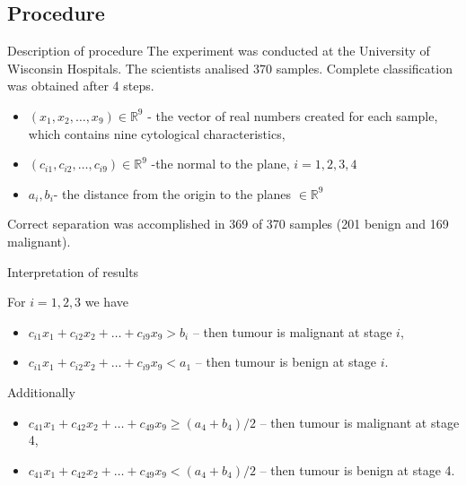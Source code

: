 \documentclass{beamer}
\begin{document}
\subsection{Procedure}
\begin{frame}[allowframebreaks]{Description of procedure}
The experiment was conducted at the University of Wisconsin Hospitals. The scientists analised 370 samples. Complete classification was obtained after 4 steps.
\begin{block}

\begin{itemize}
\item $(x_1,x_2, \ldots, x_9) \in \mathbb{R}^9$ - the vector of real numbers created for each sample, which contains nine cytological characteristics,
\item  $(c_{i1},c_{i2}, \ldots, c_{i9}) \in \mathbb{R}^9$ -the normal to the plane, $i=1,2,3,4$
\item $a_i,b_i$- the distance from the origin to the planes  $\in \mathbb{R}^9$
\end{itemize}

\end{block}
Correct separation was accomplished in 369 of 370 samples (201 benign
and 169 malignant).
\begin{block}{Interpretation of results}

For $i=1,2,3$ we have
\begin{itemize}
\item $c_{i1}x_1+c_{i2}x_2+\ldots+c_{i9}x_9>b_i$ -- then  tumour is malignant at stage $i$,
\item $c_{i1}x_1+c_{i2}x_2+\ldots+c_{i9}x_9<a_1$ -- then  tumour is benign at
stage $i$.
\end{itemize}

Additionally

\begin{itemize}
\item $c_{41}x_1+c_{42}x_2+\ldots+c_{49}x_9\geq(a_4+b_4)/2$ -- then tumour is malignant at stage 4,
\item $c_{41}x_1+c_{42}x_2+\ldots+c_{49}x_9<(a_4+b_4)/2$ -- then tumour is benign at stage 4.
\end{itemize}


\end{block}



\end{frame}
\end{document}
